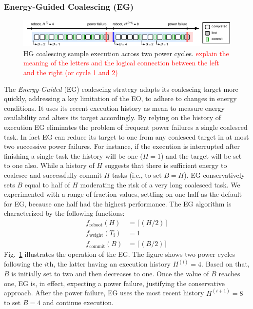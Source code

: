 \subsubsection{Energy-Guided Coalescing (EG)}
\label{subsec:energyAware}
%
\begin{figure}
    \includegraphics[width=\linewidth]{figures/hg-coal-horiz.pdf}
    \caption{HG coalescing sample execution across two power cycles. \textcolor{red}{explain the meaning of the letters and the logical connection between the left and the right (or cycle 1 and 2)}}
    \label{fig:hg-coal}
\end{figure}
%
The \emph{Energy-Guided} (EG) coalescing strategy adapts its coalescing target more quickly, addressing a key limitation of the EO, to adhere to changes in energy conditions. It uses its recent execution history as 
mean to measure energy availability and alters its target accordingly.
By relying on the history of execution EG eliminates the problem of frequent power failures a single coalesced task. In fact EG can reduce its target to one from any coalesced target in at most two successive power failures. For instance, if the execution is interrupted after finishing a single task the history will be one ($H = 1$) and the target will be set to one also. 
While a history of $H$ suggests that there is sufficient energy to coalesce and
successfully commit $H$ tasks (i.e., to set $B = H$). EG conservatively sets $B$ equal to half of $H$ moderating the risk of a very long coalesced task. We experimented with a range of fraction values, settling on one half as the default for EG, because one half had the highest performance. The EG algorithm is characterized by the following functions: 
%
\begin{equation}
	\begin{split}
		 f_\text{reboot}(H) 			& = \lceil(H / 2)\rceil \\
		 f_\text{weight}(T_\text{i}) 	& =  1 \\
		 f_\text{commit}(B) 			& = \lceil(B / 2)\rceil
	\end{split}
\end{equation}
%
Fig.~\ref{fig:hg-coal} illustrates the operation of the EG.
The figure shows two power cycles following the $i$th, the latter having an
execution history $H^{(i)} = 4$.
Based on that, $B$ is initially set to two and then decreases to one. Once the
value of $B$ reaches one, EG is, in effect, expecting a power failure,
justifying the conservative approach. After the power failure, EG
uses the most recent history $H^{(i+1)} = 8$ to set $B = 4$
and continue execution.
%

